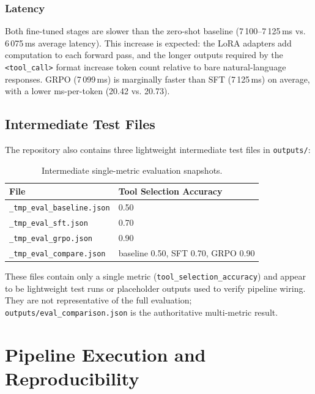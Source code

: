 \documentclass[12pt, a4paper]{article}
\newcommand{\thead}[1]{\textbf{#1}}
\begin{document}
\subsubsection{Latency}

Both fine-tuned stages are slower than the zero-shot baseline
(7\,100--7\,125\,ms vs. 6\,075\,ms average latency). This increase is expected:
the LoRA adapters add computation to each forward pass, and the longer outputs
required by the \texttt{<tool\_call>} format increase token count relative to
bare natural-language responses. GRPO (7\,099\,ms) is marginally faster than
SFT (7\,125\,ms) on average, with a lower ms-per-token (20.42 vs. 20.73).

\subsection{Intermediate Test Files}

The repository also contains three lightweight intermediate test files in
\texttt{outputs/}:

\begin{table}[H]
\centering
\caption{Intermediate single-metric evaluation snapshots.}
\begin{tabularx}{\linewidth}{L{5.5cm} C{8.7cm}}
\toprule
\thead{File} & \thead{Tool Selection Accuracy} \\
\midrule
\texttt{\_tmp\_eval\_baseline.json} & 0.50 \\
\texttt{\_tmp\_eval\_sft.json} & 0.70 \\
\texttt{\_tmp\_eval\_grpo.json} & 0.90 \\
\texttt{\_tmp\_eval\_compare.json} & baseline 0.50, SFT 0.70, GRPO 0.90 \\
\bottomrule
\end{tabularx}
\end{table}

These files contain only a single metric (\texttt{tool\_selection\_accuracy})
and appear to be lightweight test runs or placeholder outputs used to verify
pipeline wiring. They are not
representative of the full evaluation; \texttt{outputs/eval\_comparison.json}
is the authoritative multi-metric result.



\newpage

\section{Pipeline Execution and Reproducibility}
\end{document}
